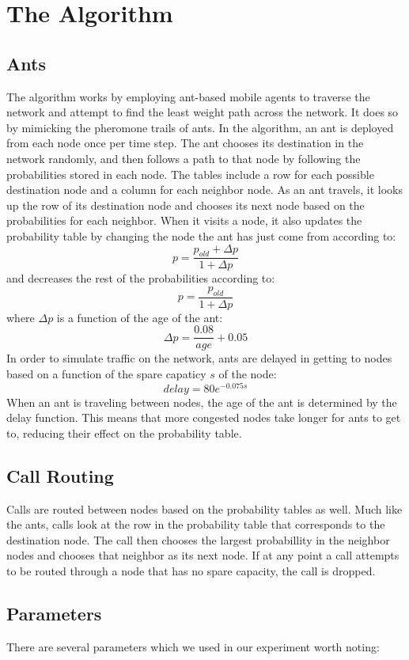 
\section{The Algorithm}
\label{sec:expts}

\subsection{Ants}
The algorithm works by employing ant-based mobile agents to traverse the network and attempt to find the least weight path across the network. It does so by mimicking the pheromone trails of ants. In the algorithm, an ant is deployed from each node once per time step. The ant chooses its destination in the network randomly, and then follows a path to that node by following the probabilities stored in each node. The tables include a row for each possible destination node and a column for each neighbor node. As an ant travels, it looks up the row of its destination node and chooses its next node based on the probabilities for each neighbor. When it visits a node, it also updates the probability table by changing the node the ant has just come from according to: $$p = \frac{p_{old} + \Delta p}{1 + \Delta p}$$ and decreases the rest of the probabilities according to: $$p = \frac{p_{old}}{1 + \Delta p}$$ where $\Delta p$ is a function of the age of the ant: $$\Delta p = \frac{0.08}{age} + 0.05$$ In order to simulate traffic on the network, ants are delayed in getting to nodes based on a function of the spare capaticy $s$ of the node: $$delay = 80e^{-0.075s}$$ When an ant is traveling between nodes, the age of the ant is determined by the delay function. This means that more congested nodes take longer for ants to get to, reducing their effect on the probability table.

\subsection{Call Routing}
Calls are routed between nodes based on the probability tables as well. Much like the ants, calls look at the row in the probability table that corresponds to the destination node. The call then chooses the largest probabillity in the neighbor nodes and chooses that neighbor as its next node. If at any point a call attempts to be routed through a node that has no spare capacity, the call is dropped.

\subsection{Parameters}
There are several parameters which we used in our experiment worth noting:\\

